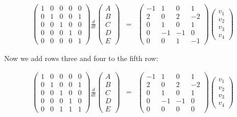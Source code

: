 \documentclass{article}
\begin{document}
\begin{eqnarray*}
\begin{pmatrix} 1 & 0 & 0 & 0 & 0\\ 0 & 1 & 0 & 0 &1\\ 0 & 0 & 1 & 0 & 0\\ 0 & 0 & 0& 1 & 0\\ 0 & 0 & 0 & 0 & 1\end{pmatrix}
\frac{d}{dt} \begin{pmatrix} A\\ B \\ C\\ D\\ E \end{pmatrix} 
& = & \begin{pmatrix} -1 & 1 & 0 & 1\\
2 & 0 & 2 & -2\\
0 & 1 & 0 & 1\\
0 & -1 & -1 & 0\\
0 & 0 & 1 & -1
\end{pmatrix} \begin{pmatrix} v_1\\ v_2 \\ v_3 \\ v_4 \end{pmatrix}
\end{eqnarray*}

Now we add rows three and four to the fifth row:

\begin{eqnarray*}
\begin{pmatrix} 1 & 0 & 0 & 0 & 0\\ 0 & 1 & 0 & 0 &1\\ 0 & 0 & 1 & 0 & 0\\ 0 & 0 & 0& 1 & 0\\ 0 & 0 & 1 & 1 & 1\end{pmatrix}
\frac{d}{dt} \begin{pmatrix} A\\ B \\ C\\ D\\ E \end{pmatrix} 
& = & \begin{pmatrix} -1 & 1 & 0 & 1\\
2 & 0 & 2 & -2\\
0 & 1 & 0 & 1\\
0 & -1 & -1 & 0\\
0 & 0 & 0 & 0
\end{pmatrix} \begin{pmatrix} v_1\\ v_2 \\ v_3 \\ v_4 \end{pmatrix}
\end{eqnarray*}
\end{document}
